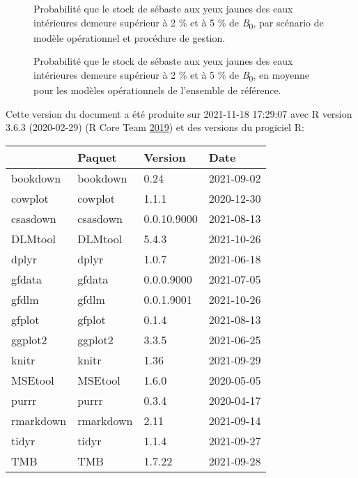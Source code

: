 \documentclass[french,11pt]{book}
\begin{document}
\begin{figure}[htb]

{\centering {} 

}

\caption{Probabilité que le stock de sébaste aux yeux jaunes des eaux intérieures demeure supérieur à 2 \% et à 5 \% de \emph{B}\textsubscript{0}, par scénario de modèle opérationnel et procédure de gestion.}\label{fig:cosewic-all}
\end{figure}
\clearpage


\begin{figure}[htb]

{\centering {} 

}

\caption{Probabilité que le stock de sébaste aux yeux jaunes des eaux intérieures demeure supérieur à 2 \% et à 5 \% de \emph{B}\textsubscript{0}, en moyenne pour les modèles opérationnels de l'ensemble de référence.}\label{fig:cosewic-avg}
\end{figure}
\clearpage


\clearpage

\hypertarget{environnement-informatique}{%
\label{environnement-informatique}}

Cette version du document a été produite sur 2021-11-18 17:29:07 avec R version 3.6.3 (2020-02-29) (R Core Team \protect\hyperlink{ref-r2019}{2019}) et des versions du progiciel R:
\begin{longtable}[]{@{}llll@{}}
\toprule
& Paquet & Version & Date \\
\midrule
\endhead
bookdown & bookdown & 0.24 & 2021-09-02 \\
cowplot & cowplot & 1.1.1 & 2020-12-30 \\
csasdown & csasdown & 0.0.10.9000 & 2021-08-13 \\
DLMtool & DLMtool & 5.4.3 & 2021-10-26 \\
dplyr & dplyr & 1.0.7 & 2021-06-18 \\
gfdata & gfdata & 0.0.0.9000 & 2021-07-05 \\
gfdlm & gfdlm & 0.0.1.9001 & 2021-10-26 \\
gfplot & gfplot & 0.1.4 & 2021-08-13 \\
ggplot2 & ggplot2 & 3.3.5 & 2021-06-25 \\
knitr & knitr & 1.36 & 2021-09-29 \\
MSEtool & MSEtool & 1.6.0 & 2020-05-05 \\
purrr & purrr & 0.3.4 & 2020-04-17 \\
rmarkdown & rmarkdown & 2.11 & 2021-09-14 \\
tidyr & tidyr & 1.1.4 & 2021-09-27 \\
TMB & TMB & 1.7.22 & 2021-09-28 \\
\bottomrule
\end{longtable}
\vspace{4mm}
\end{document}
